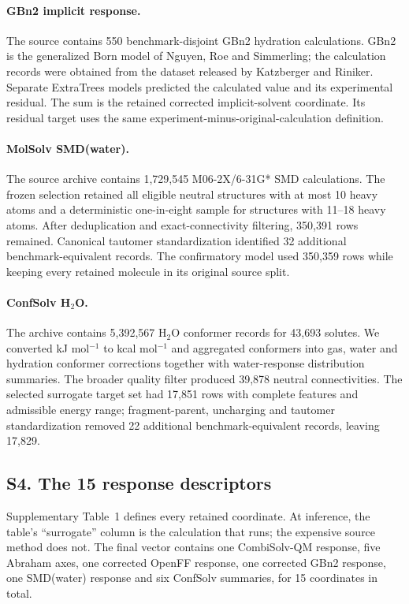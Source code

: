 \paragraph{GBn2 implicit response.}
The source contains 550 benchmark-disjoint GBn2 hydration calculations. GBn2 is the
generalized Born model of Nguyen, Roe and Simmerling;\cite{gbn22013} the calculation
records were obtained from the dataset released by Katzberger and Riniker.\cite{gnnis2024} Separate
ExtraTrees models predicted the calculated value and its experimental residual. The
sum is the retained corrected implicit-solvent coordinate. Its residual target
uses the same experiment-minus-original-calculation definition.

\paragraph{MolSolv SMD(water).}
The source archive contains 1,729,545 M06-2X/6-31G* SMD calculations. The frozen
selection retained all eligible neutral structures with at most 10 heavy atoms and a
deterministic one-in-eight sample for structures with 11--18 heavy atoms. After
deduplication and exact-connectivity filtering, 350,391 rows remained. Canonical
tautomer standardization identified 32 additional benchmark-equivalent records. The
confirmatory model used 350,359 rows while keeping every retained molecule in its
original source split.

\paragraph{ConfSolv H$_2$O.}
The archive contains 5,392,567 H$_2$O conformer records for 43,693 solutes. We
converted kJ mol$^{-1}$ to kcal mol$^{-1}$ and aggregated conformers into gas,
water and hydration conformer corrections together with water-response
distribution summaries. The broader quality filter produced 39,878 neutral
connectivities. The selected surrogate target set had 17,851 rows with complete
features and admissible energy range; fragment-parent, uncharging and tautomer
standardization removed 22 additional benchmark-equivalent records, leaving 17,829.

\subsection*{S4. The 15 response descriptors}

Supplementary Table~1 defines every retained coordinate. At inference, the table's
``surrogate'' column is the calculation that runs; the expensive source method does
not. The final vector contains one CombiSolv-QM response, five Abraham axes, one
corrected OpenFF response, one corrected GBn2 response, one SMD(water) response and
six ConfSolv summaries, for 15 coordinates in total.

